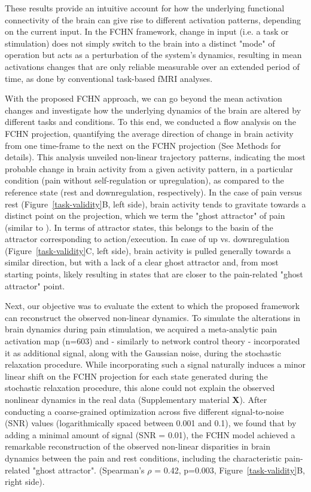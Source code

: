 \documentclass{article}
\begin{document}
These results provide an intuitive account for how the underlying functional connectivity of the brain can give rise to different activation patterns, depending on the current input. In the FCHN framework, change in input (i.e. a task or stimulation) does not simply switch to the brain into a distinct "mode" of operation but acts as
a perturbation of the system's dynamics, resulting in mean activations changes that are only reliable measurable over an extended period of time, as done by conventional task-based fMRI analyses.

With the proposed FCHN approach, we can go beyond the mean activation changes and investigate how the underlying dynamics of the brain are altered by different tasks and conditions. To this end, we conducted a flow analysis on the FCHN projection, quantifying the average direction of change in brain activity from one time-frame to the next on the FCHN projection (See Methods for details).
This analysis unveiled non-linear trajectory patterns, indicating the most probable change in brain activity from a given activity pattern, in a particular condition (pain without self-regulation or upregulation), as
compared to the reference state (rest and downregulation, respectively). In the case of pain versus rest (Figure~\ref{task-validity}B, left side), brain activity tends to gravitate towards a distinct point on the projection, which we term the "ghost attractor" of pain (similar to \cite{vohryzek2020ghost}). In terms of attractor states, this belongs to the basin of the attractor corresponding to action/execution. In case of up vs. downregulation (Figure~\ref{task-validity}C, left side), brain activity is pulled generally towards a similar direction, but with a lack of a clear ghost attractor and, from most starting points, likely resulting in states that are closer to the pain-related "ghost attractor" point.

Next, our objective was to evaluate the extent to which the proposed framework can reconstruct the observed non-linear dynamics. To simulate the alterations in brain dynamics during pain stimulation, we acquired a meta-analytic pain activation map \citep{zunhammer2021meta} (n=603) and - similarly to network control theory \citep{gu2015controllability}- incorporated it as additional signal, along with the Gaussian noise,
during the stochastic relaxation procedure. While incorporating such a signal naturally induces a minor linear shift on the FCHN projection for each state generated during the stochastic relaxation procedure, this alone could not explain the observed nonlinear dynamics in the real data (Supplementary material \textbf{X}). After conducting a
coarse-grained optimization across five different signal-to-noise (SNR) values (logarithmically spaced between
0.001 and 0.1), we found that by adding a minimal amount of signal (SNR = 0.01), the FCHN model achieved a remarkable reconstruction of the observed non-linear disparities in brain dynamics between the pain and rest conditions, including the characteristic pain-related "ghost attractor". (Spearman's $\rho$ = 0.42, p=0.003,
Figure~\ref{task-validity}B, right side).
\end{document}
